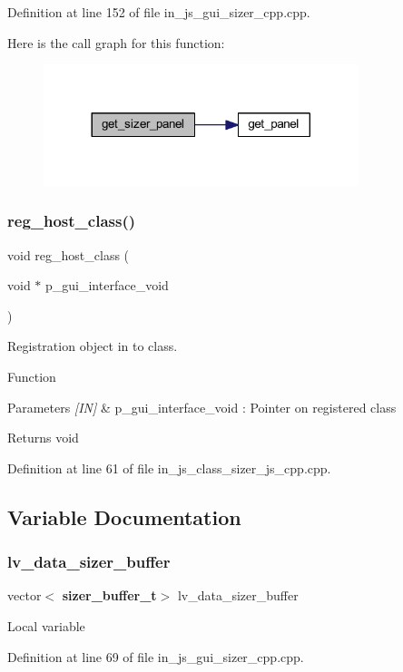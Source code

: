 Definition at line 152 of file in\+\_\+js\+\_\+gui\+\_\+sizer\+\_\+cpp.\+cpp.

Here is the call graph for this function\+:\nopagebreak
\begin{figure}[H]
\begin{center}
\leavevmode
\includegraphics[width=260pt]{group___sizer_ga505e8cc5282fc14f547b1da967ebc44a_cgraph}
\end{center}
\end{figure}
\mbox{\label{group___sizer_gac715b4a43bb361fc96ce6f1b50d68a8b}} 
\subsubsection{reg\_host\_class()}
{\footnotesize\ttfamily void reg\+\_\+host\+\_\+class (\begin{DoxyParamCaption}\item[{void $\ast$}]{p\+\_\+gui\+\_\+interface\+\_\+void }\end{DoxyParamCaption})}



Registration object in to class. 

Function
\begin{DoxyParams}{Parameters}
{\em \mbox{[}\+I\+N\mbox{]}} & p\+\_\+gui\+\_\+interface\+\_\+void \+: Pointer on registered class \\
\hline
\end{DoxyParams}
\begin{DoxyReturn}{Returns}
void 
\end{DoxyReturn}


Definition at line 61 of file in\+\_\+js\+\_\+class\+\_\+sizer\+\_\+js\+\_\+cpp.\+cpp.



\subsection{Variable Documentation}
\mbox{\label{group___sizer_ga8a33453947d24f7c6aa48f7b41c6a4bc}} 
\subsubsection{lv\_data\_sizer\_buffer}
{\footnotesize\ttfamily vector$<$\textbf{ sizer\+\_\+buffer\+\_\+t}$>$ lv\+\_\+data\+\_\+sizer\+\_\+buffer}

Local variable 

Definition at line 69 of file in\+\_\+js\+\_\+gui\+\_\+sizer\+\_\+cpp.\+cpp.

